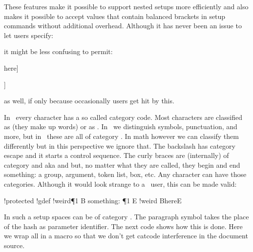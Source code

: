These features make it possible to support nested setups more efficiently and
also makes it possible to accept values that contain balanced brackets in setup
commands without additional overhead. Although it has never been an issue to let
users specify:

\starttyping
{}

\setupfoo[before={\blank[big]}]
\stoptyping

it might be less confusing to permit:

\starttyping
\defineoverlay[whatever][some \command[withparameters] here]

\setupfoo[before=\blank[big]]
\stoptyping

as well, if only because occasionally users get hit by this.

\stopsectionlevel

\startsectionlevel[title=Duplicate hashes]

In \TEX\ every character has a so called category code. Most characters are
classified as  (they make up words) or as . In
\UNICODE\ we distinguish symbols, punctuation, and more, but in \TEX\ these are
all of category . In math however we can classify them differently
but in this perspective we ignore that. The backslash has category \quote
{escape} and it starts a control sequence. The curly braces are (internally) of
category  and  aka 
and  but, no matter what they are called, they begin and end
something: a group, argument, token list, box, etc. Any character can have those
categories. Although it would look strange to a \TEX\ user, this can be made
valid:

\startbuffer
!protected !gdef !weird¶1
B
    something: ¶1
E
!weird BhereE
\stopbuffer

\typebuffer

In such a setup spaces can be of category . The paragraph
symbol takes the place of the hash as parameter identifier. The next code shows
how this is done. Here we wrap all in a macro so that we don't get catcode
interference in the document source.

\startbuffer[demo]
\NotSoTeX
{}
\stopbuffer

